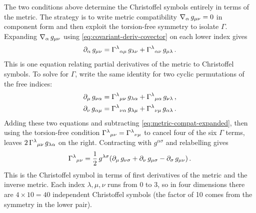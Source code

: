 The two conditions above determine the Christoffel symbols entirely in terms of
the metric.  The strategy is to write metric compatibility
$\nabla_{\alpha}\, g_{\mu\nu} = 0$ in component form and then exploit the
torsion-free symmetry to isolate $\Gamma$.  Expanding $\nabla_{\alpha}\,g_{\mu\nu}$
using \cref{eq:covariant-deriv-covector} on each lower index gives
%
\begin{equation}
  \partial_{\alpha}\, g_{\mu\nu}
    = \Gamma^{\lambda}{}_{\alpha \mu}\, g_{\lambda\nu}
    + \Gamma^{\lambda}{}_{\alpha \nu}\, g_{\mu\lambda} \,.
  \label{eq:metric-compat-expanded}
\end{equation}
%
This is one equation relating partial derivatives of the metric to Christoffel
symbols.  To solve for $\Gamma$, write the same identity for two cyclic
permutations of the free indices:
%
\begin{align}
  \partial_{\mu}\, g_{\nu\alpha}
    &= \Gamma^{\lambda}{}_{\mu \nu}\, g_{\lambda\alpha}
    + \Gamma^{\lambda}{}_{\mu \alpha}\, g_{\nu\lambda} \,,
  \label{eq:metric-compat-perm1} \\
  \partial_{\nu}\, g_{\alpha\mu}
    &= \Gamma^{\lambda}{}_{\nu \alpha}\, g_{\lambda\mu}
    + \Gamma^{\lambda}{}_{\nu \mu}\, g_{\alpha\lambda} \,.
  \label{eq:metric-compat-perm2}
\end{align}
%
Adding these two equations and subtracting \cref{eq:metric-compat-expanded},
then using the torsion-free condition
$\Gamma^{\lambda}{}_{\mu \nu} = \Gamma^{\lambda}{}_{\nu \mu}$ to cancel
four of the six $\Gamma$ terms, leaves
$2\,\Gamma^{\lambda}{}_{\mu \nu}\, g_{\lambda\alpha}$ on the right.
Contracting with $g^{\alpha\sigma}$ and relabelling gives
%
\begin{equation}
  \Gamma^{\lambda}{}_{\mu \nu} = \frac{1}{2}\,g^{\lambda\sigma}\!
    \left(
      \partial_{\mu}\, g_{\nu\sigma}
    + \partial_{\nu}\, g_{\mu\sigma}
    - \partial_{\sigma}\, g_{\mu\nu}
    \right) .
  \label{eq:christoffel-formula}
\end{equation}
%
This is the Christoffel symbol in terms of first derivatives of the metric and
the inverse metric.  Each index $\lambda,\mu,\nu$ runs from 0 to 3, so in four
dimensions there are $4 \times 10 = 40$ independent Christoffel symbols
(the factor of 10 comes from the symmetry in the lower pair).

